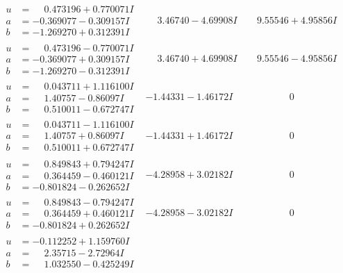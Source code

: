 \documentclass[1p]{elsarticle_modified}
\theoremstyle{definition}
\begin{document}
$$\begin{array}{c|c|c}
\begin{aligned}
u &= \phantom{-}0.473196 + 0.770071 I \\
a &= -0.369077 - 0.309157 I \\
b &= -1.269270 + 0.312391 I\end{aligned}
 & \phantom{-}3.46740 - 4.69908 I & \phantom{-}9.55546 + 4.95856 I \\ \hline\begin{aligned}
u &= \phantom{-}0.473196 - 0.770071 I \\
a &= -0.369077 + 0.309157 I \\
b &= -1.269270 - 0.312391 I\end{aligned}
 & \phantom{-}3.46740 + 4.69908 I & \phantom{-}9.55546 - 4.95856 I \\ \hline\begin{aligned}
u &= \phantom{-}0.043711 + 1.116100 I \\
a &= \phantom{-}1.40757 - 0.86097 I \\
b &= \phantom{-}0.510011 - 0.672747 I\end{aligned}
 & -1.44331 - 1.46172 I & \phantom{-0.000000 } 0 \\ \hline\begin{aligned}
u &= \phantom{-}0.043711 - 1.116100 I \\
a &= \phantom{-}1.40757 + 0.86097 I \\
b &= \phantom{-}0.510011 + 0.672747 I\end{aligned}
 & -1.44331 + 1.46172 I & \phantom{-0.000000 } 0 \\ \hline\begin{aligned}
u &= \phantom{-}0.849843 + 0.794247 I \\
a &= \phantom{-}0.364459 - 0.460121 I \\
b &= -0.801824 - 0.262652 I\end{aligned}
 & -4.28958 + 3.02182 I & \phantom{-0.000000 } 0 \\ \hline\begin{aligned}
u &= \phantom{-}0.849843 - 0.794247 I \\
a &= \phantom{-}0.364459 + 0.460121 I \\
b &= -0.801824 + 0.262652 I\end{aligned}
 & -4.28958 - 3.02182 I & \phantom{-0.000000 } 0 \\ \hline\begin{aligned}
u &= -0.112252 + 1.159760 I \\
a &= \phantom{-}2.35715 - 2.72964 I \\
b &= \phantom{-}1.032550 - 0.425249 I\end{aligned}

\end{array}$$
\end{document}
